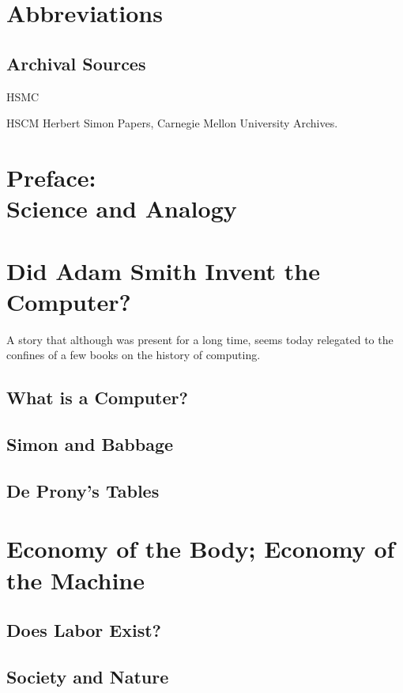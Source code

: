 \documentclass[version=last,draft=false,paper=A4,portrait,twoside=true,twocolumn=false,headinclude=false,footinclude=false,fontsize=11,BCOR=20mm,DIV=calc,pagesize=auto,titlepage=firstiscover,mpinclude=false,open=right,chapterprefix=true,numbers=autoendperiod,headsepline=false,parskip=false]{scrbook}
\begin{document}
\chapter{Abbreviations} 
\section*{Archival Sources}

\begin{labeling}[:]{HSMC} 
\item[HSCM] Herbert Simon Papers, Carnegie Mellon University Archives.
\end{labeling}

\chapter[Preface]{Preface:\\ Science and Analogy} 

\lipsum
\mainmatter
\pagestyle{scrheadings}
\chapter{Did Adam Smith Invent the Computer?}
\label{sec:org761dd6b}
A story that although was present for a long time, seems today relegated to
the confines of a few books on the history of computing. 
\section{What is a Computer?}
\label{sec:org2edf4ac}
\lipsum
\section{Simon and Babbage}
\label{sec:orga12f388}
\lipsum
\section{De Prony's Tables}
\label{sec:orgf1ed8fe}
\lipsum
\chapter{Economy of the Body; Economy of the Machine}
\label{sec:org8d9fdbf}
\section{Does Labor Exist?}
\label{sec:orgda5341e}
\section{Society and Nature}
\label{sec:org4b418a9}
\end{document}
